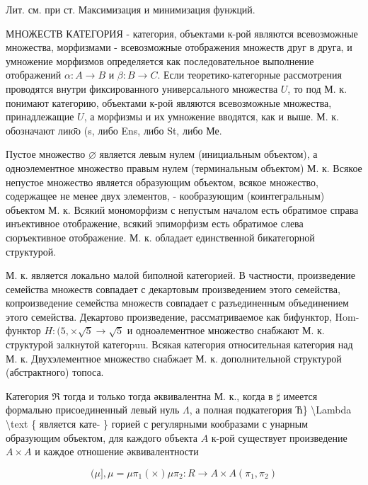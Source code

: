 \documentclass[10pt]{article}
\begin{document}
Лит. см. при ст. Максимизация и минимизация фунжций.



МНОЖЕСТВ КАТЕГОРИЯ - категория, объектами к-рой являются всевозможные множества, морфизмами - всевозможные отображения множеств друг в друга, и умножение морфизмов определяется как последовательное выполнение отображений $\alpha: A \rightarrow B$ и $\beta: B \rightarrow C$. Если теоретико-категорные рассмотрения проводятся внутри фиксированного универсального множества $U$, то под М. к. понимают категорию, объектами к-рой являются всевозможные множества, принадлежащие $U$, а морфизмы и их умножение вводятся, как и выше. М. к. обозначают лию̄о (s, либо Ens, либо St, либо Ме.



Пустое множество $\varnothing$ является левым нулем (инициальным объектом), а одноэлементное множество правым нулем (терминальным объектом) М. к. Всякое непустое множество является образующим объектом, всякое множество, содержащее не менее двух элементов, - кообразующим (коинтегральным) объектом М. к. Всякий мономорфизм с непустым началом есть обратимое справа инъективное отображение, всякий эпиморфизм есть обратимое слева сюръективное отображение. М. к. обладает единственной бикатегорной структурой.



М. к. является локально малой биполной категорией. В частности, произведение семейства множеств совпадает с декартовым произведением этого семейства, копроизведение семейства множеств совпадает с разъединенным объединением этого семейства. Декартово произведение, рассматриваемое как бифунктор, Hom-функтор $H:(5, \times \sqrt{5} \rightarrow \sqrt{5}$ и одноәлементное множество снабжают М. к. структурой залкнутой категоpuu. Всякая категория относительная категория над М. к. Двухэлементное множество снабжает М. к. дополнительной структурой (абстрактного) топоса.



Категория $\mathfrak{\Re}$ тогда и только тогда әквивалентна М. к., когда в $\mathfrak{\sharp}$ имеется формально присоединенный левый нуль $\Lambda$, а полная подкатегория Ћ\} \textbackslash Lambda \textbackslash text \{ является кате- \} горией с регулярными кообразами с унарным образующим объектом, для каждого объекта $A$ к-рой существует произведение $A \times A$ и каждое отношение әквивалентности



\[

(\mu], \mu=\mu \pi_{1}(\times) \mu \pi_{2}: R \longrightarrow A \times A\left(\pi_{1}, \pi_{2}\right)

\]
\end{document}
